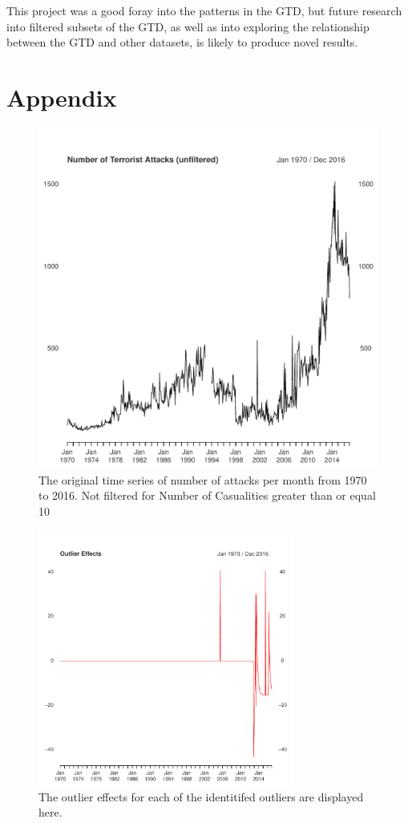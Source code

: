 \documentclass[11pt]{paper}
\begin{document}
This project was a good foray into the patterns in the GTD, but future research into filtered subsets of the GTD, as well as into exploring the relationship between the GTD and other datasets, is likely to produce novel results.

\printbibliography


\section{Appendix}
\begin{figure}[h]
\centering
\includegraphics[width=0.75\linewidth]{../image/og_og_og.pdf}
\caption{The original time series of number of attacks per month from 1970 to 2016. Not filtered for Number of Casualities greater than or equal 10}
\label{ogogog}
\end{figure}

\begin{figure}[h]
\centering
    \includegraphics[width=0.75\textwidth]{../image/outlier_effects.pdf}
\caption{The outlier effects for each of the identitifed outliers are displayed here.}
\label{outlier_effect}
\end{figure}
\end{document}
